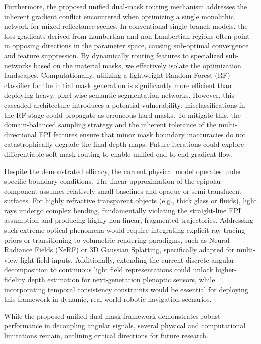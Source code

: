 Furthermore, the proposed unified dual-mask routing mechanism addresses the inherent gradient conflict encountered when optimizing a single monolithic network for mixed-reflectance scenes. In conventional single-branch models, the loss gradients derived from Lambertian and non-Lambertian regions often point in opposing directions in the parameter space, causing sub-optimal convergence and feature suppression. By dynamically routing features to specialized sub-networks based on the material masks, we effectively isolate the optimization landscapes. Computationally, utilizing a lightweight Random Forest (RF) classifier for the initial mask generation is significantly more efficient than deploying heavy, pixel-wise semantic segmentation networks. However, this cascaded architecture introduces a potential vulnerability: misclassifications in the RF stage could propagate as erroneous hard masks. To mitigate this, the domain-balanced sampling strategy and the inherent tolerance of the multi-directional EPI features ensure that minor mask boundary inaccuracies do not catastrophically degrade the final depth maps. Future iterations could explore differentiable soft-mask routing to enable unified end-to-end gradient flow.

Despite the demonstrated efficacy, the current physical model operates under specific boundary conditions. The linear approximation of the epipolar component assumes relatively small baselines and opaque or semi-translucent surfaces. For highly refractive transparent objects (e.g., thick glass or fluids), light rays undergo complex bending, fundamentally violating the straight-line EPI assumption and producing highly non-linear, fragmented trajectories. Addressing such extreme optical phenomena would require integrating explicit ray-tracing priors or transitioning to volumetric rendering paradigms, such as Neural Radiance Fields (NeRF) or 3D Gaussian Splatting, specifically adapted for multi-view light field inputs. Additionally, extending the current discrete angular decomposition to continuous light field representations could unlock higher-fidelity depth estimation for next-generation plenoptic sensors, while incorporating temporal consistency constraints would be essential for deploying this framework in dynamic, real-world robotic navigation scenarios.

While the proposed unified dual-mask framework demonstrates robust performance in decoupling angular signals, several physical and computational limitations remain, outlining critical directions for future research.

